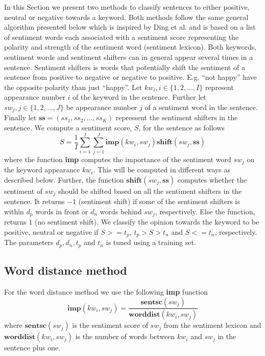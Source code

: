 \documentclass[11pt]{article}
\begin{document}
In this Section we present two methods to classify sentences to either positive, neutral or negative towards a keyword. Both methods follow the same general algorithm presented below which is inspired by Ding et al.  and is based on a list of sentiment words each associated with a sentiment score representing the polarity and strength of the sentiment word (sentiment lexicon). Both keywords, sentiment words and sentiment shifters can in general appear several times in a sentence. Sentiment shifters is words that potentially shift the sentiment of a sentence from positive to negative or negative to positive. E.g. ``not happy'' have the opposite polarity than just ``happy''. Let $kw_i, i \in \{1,2,\ldots,I\}$ represent appearance number $i$ of the keyword in the sentence. Further let $sw_{j}, j \in \{1,2,\ldots,J\}$ be appearance number $j$ of a sentiment word in the sentence. Finally let $\textbf{ss} = (ss_1, ss_2, \ldots, ss_K)$ repressent the sentiment shifters in the sentence. We compute a sentiment score, $S$, for the sentence as follows
\begin{equation}
  \label{eq:1}
  S = \frac{1}{I}\sum_{i=1}^{I} \sum_{j=1}^{J} \mathbf{imp}(kw_i, sw_{j})\mathbf{shift}(sw_{j}, \mathbf{ss})    
\end{equation}
where the function \textbf{imp} computes the importance of the sentiment word $sw_{j}$ on the keyword appearance $kw_i$. This will be computed in different ways as described below. Further, the function $\mathbf{shift}(sw_{j}, \mathbf{ss})$ computes whether the sentiment of $sw_{j}$ should be shifted based on all the sentiment shifters in the sentence. It returns $-1$ (sentiment shift) if some of the sentiment shifters is within $d_{p}$ words in front or $d_{n}$ words behind $sw_{j}$, respectively. Else the function, returns $1$ (no sentiment shift). We classify the opinion towards the keyword to be positive, neutral or negative if $S >= t_p$,  $t_p > S > t_n$ and  $S <= t_n$, respectively. The parameters $d_p, d_n, t_p$ and $t_n$ is tuned using a training set.

\subsection{Word distance method}
\label{sec:wd}

For the word distance method we use the following \textbf{imp} function
\begin{equation}
  \label{eq:2}
  \mathbf{imp}(kw_i, sw_{j}) = \frac{\mathbf{sentsc}(sw_{j})}{\mathbf{worddist}(kw_i, sw_{j})}
\end{equation}
where $\mathbf{sentsc}(sw_{j})$ is the sentiment score of $sw_{j}$ from the sentiment lexicon and $\mathbf{worddist}(kw_i, sw_{j})$ is the number of words between $kw_i$ and $sw_{j}$ in the sentence plus one.
\end{document}
